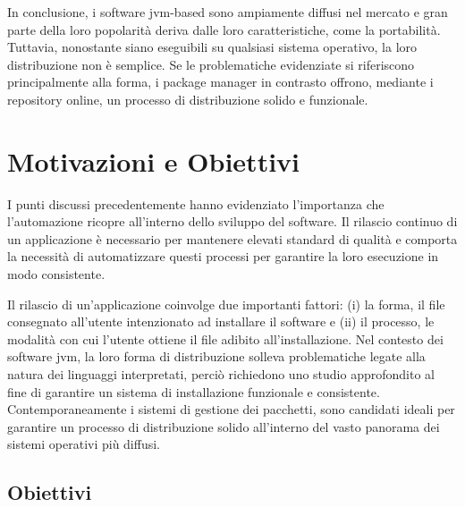 In conclusione, i software \ac{jvm}-based sono ampiamente diffusi nel mercato e gran parte della loro popolarità deriva dalle loro caratteristiche, come la portabilità. Tuttavia, nonostante siano eseguibili su qualsiasi sistema operativo, la loro distribuzione non è semplice. Se le problematiche evidenziate si riferiscono principalmente alla forma, i package manager in contrasto offrono, mediante i repository online, un processo di distribuzione solido e funzionale.

\section{Motivazioni e Obiettivi}
I punti discussi precedentemente hanno evidenziato l'importanza che l'automazione ricopre all'interno dello sviluppo del software. Il rilascio continuo di un applicazione è necessario per mantenere elevati standard di qualità e comporta la necessità di automatizzare questi processi per garantire la loro esecuzione in modo consistente. 

Il rilascio di un'applicazione coinvolge due importanti fattori: (i) la forma, il file consegnato all'utente intenzionato ad installare il software e (ii) il processo, le modalità con cui l'utente ottiene il file adibito all'installazione. Nel contesto dei software \ac{jvm}, la loro forma di distribuzione solleva problematiche legate alla natura dei linguaggi interpretati, perciò richiedono uno studio approfondito al fine di garantire un sistema di installazione funzionale e consistente. Contemporaneamente i sistemi di gestione dei pacchetti, sono candidati ideali per garantire un processo di distribuzione solido all'interno del vasto panorama dei sistemi operativi più diffusi.

\subsection{Obiettivi}

